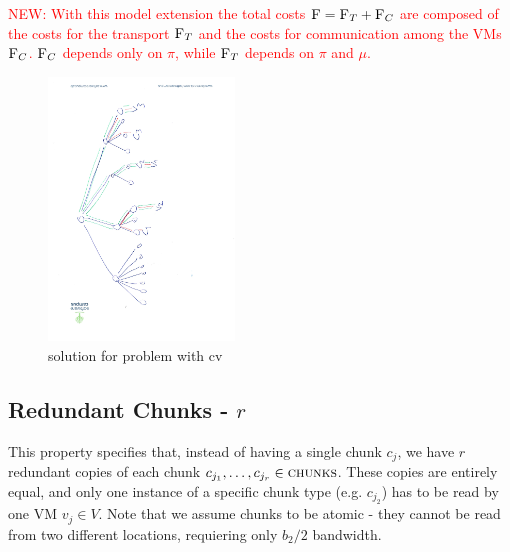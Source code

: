 \documentclass[9pt,twocolumn]{scrartcl}
\newcommand{\VM}{\textsc{VM}}
\newcommand{\carlo}[1]{\textcolor{red}{#1}}
\newcommand{\RedundancyFactor}{\ensuremath{r}}
\newcommand{\VmChunkAssignment}{\mu}
\newcommand{\NodeMapping}{\pi}
\newcommand{\VirtualNodes}{\ensuremath{V}}
\newcommand{\VirtualNode}{v}
\newcommand{\Chunks}{\ensuremath{\textsc{chunks}}}
\newcommand{\achunk}{\ensuremath{c}}
\newcommand{\Cost}{\textsc{F}}
\newcommand{\CostTrans}{\ensuremath{b_2}}
\begin{document}
\begin{appendix}
\carlo{NEW: With this model extension the total costs $\Cost = \Cost_T +
\Cost_C$ are composed of the costs for the transport $\Cost_T$ and the costs
for communication among the VMs $\Cost_C$. $\Cost_C$ depends only on
$\NodeMapping$, while $\Cost_T$ depends on $\NodeMapping$ and
$\VmChunkAssignment$.}

\begin{figure}

\includegraphics[angle=270,origin=c, height=7cm]{figs/model_fig_skteches/cv}
\caption{solution for problem with cv}
\end{figure}



\subsection{Redundant Chunks - $r$}

This property specifies that, instead of having a single chunk $\achunk_j$, we
have $\RedundancyFactor$ redundant copies of each chunk
$\achunk_{j_1},\dots,\achunk_{j_\RedundancyFactor}  \in \Chunks$. These copies are
entirely equal, and only one instance of a specific chunk type (e.g.
$\achunk_{j_2}$) has to be read by one VM $\VirtualNode_j \in \VirtualNodes$.
Note that we assume chunks to be atomic - they cannot be read from two different
locations, requiering only $\CostTrans / 2$  bandwidth.

\begin{figure}


\end{figure}
\end{appendix}
\end{document}
